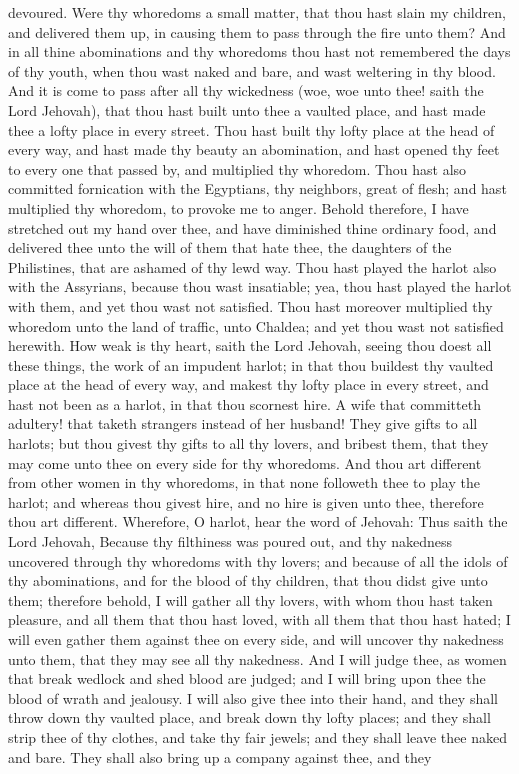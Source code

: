 devoured. Were thy whoredoms a small matter, that thou hast slain my children, and delivered them up, in causing them to pass through the fire unto them? And in all thine abominations and thy whoredoms thou hast not remembered the days of thy youth, when thou wast naked and bare, and wast weltering in thy blood.  And it is come to pass after all thy wickedness (woe, woe unto thee! saith the Lord Jehovah), that thou hast built unto thee a vaulted place, and hast made thee a lofty place in every street. Thou hast built thy lofty place at the head of every way, and hast made thy beauty an abomination, and hast opened thy feet to every one that passed by, and multiplied thy whoredom. Thou hast also committed fornication with the Egyptians, thy neighbors, great of flesh; and hast multiplied thy whoredom, to provoke me to anger. Behold therefore, I have stretched out my hand over thee, and have diminished thine ordinary food, and delivered thee unto the will of them that hate thee, the daughters of the Philistines, that are ashamed of thy lewd way. Thou hast played the harlot also with the Assyrians, because thou wast insatiable; yea, thou hast played the harlot with them, and yet thou wast not satisfied. Thou hast moreover multiplied thy whoredom unto the land of traffic, unto Chaldea; and yet thou wast not satisfied herewith.  How weak is thy heart, saith the Lord Jehovah, seeing thou doest all these things, the work of an impudent harlot; in that thou buildest thy vaulted place at the head of every way, and makest thy lofty place in every street, and hast not been as a harlot, in that thou scornest hire. A wife that committeth adultery! that taketh strangers instead of her husband! They give gifts to all harlots; but thou givest thy gifts to all thy lovers, and bribest them, that they may come unto thee on every side for thy whoredoms. And thou art different from other women in thy whoredoms, in that none followeth thee to play the harlot; and whereas thou givest hire, and no hire is given unto thee, therefore thou art different.  Wherefore, O harlot, hear the word of Jehovah: Thus saith the Lord Jehovah, Because thy filthiness was poured out, and thy nakedness uncovered through thy whoredoms with thy lovers; and because of all the idols of thy abominations, and for the blood of thy children, that thou didst give unto them; therefore behold, I will gather all thy lovers, with whom thou hast taken pleasure, and all them that thou hast loved, with all them that thou hast hated; I will even gather them against thee on every side, and will uncover thy nakedness unto them, that they may see all thy nakedness. And I will judge thee, as women that break wedlock and shed blood are judged; and I will bring upon thee the blood of wrath and jealousy. I will also give thee into their hand, and they shall throw down thy vaulted place, and break down thy lofty places; and they shall strip thee of thy clothes, and take thy fair jewels; and they shall leave thee naked and bare. They shall also bring up a company against thee, and they 